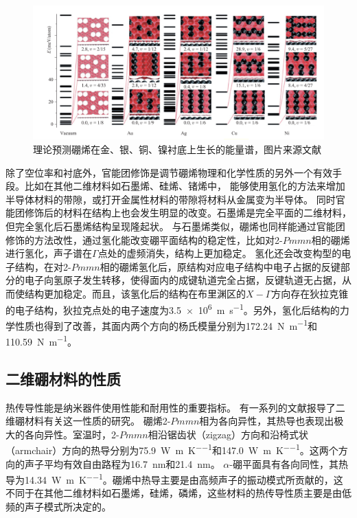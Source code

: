 \begin{figure}[bt]
  \includegraphics[width=1.0\textwidth]{figs/ch1_borophene_energy_spectra.png}
  \centering
  \caption{理论预测硼烯在金、银、铜、镍衬底上生长的能量谱，图片来源文献\cite{zhang2015two}}
  \label{fig:ch1_borophene_energy_spectra}
\end{figure}

除了空位率和衬底外，官能团修饰是调节硼烯物理和化学性质的另外一个有效手段。比如在其他二维材料如石墨烯、硅烯、锗烯中，
能够使用氢化的方法来增加半导体材料的带隙，或打开金属性材料的带隙将材料从金属变为半导体\cite{balog2010bandgap,bhattacharya2011strain,houssa2011electronic}。
同时官能团修饰后的材料在结构上也会发生明显的改变。石墨烯是完全平面的二维材料，但完全氢化后石墨烯结构呈现隆起状。
与石墨烯类似，硼烯也同样能通过官能团修饰的方法改性，通过氢化能改变硼平面结构的稳定性，比如对2-$Pmmn$相的硼烯进行氢化，声子谱在$\Gamma$点处的虚频消失，结构上更加稳定\cite{xu2016hydrogenated,wang2016high}。
氢化还会改变构型的电子结构\cite{xu2016hydrogenated}，在对2-$Pmmn$相的硼烯氢化后，原结构对应电子结构中电子占据的反键部分的电子向氢原子发生转移，使得面内的成键轨道完全占据，反键轨道无占据，从而使结构更加稳定。而且，该氢化后的结构在布里渊区的$X-\Gamma$方向存在狄拉克锥的电子结构，狄拉克点处的电子速度为\SI{3.5e6}{\metre\per\second}\cite{xu2016hydrogenated}。另外，氢化后结构的力学性质也得到了改善，其面内两个方向的杨氏模量分别为\SI{172.24}{\N\per\meter}和\SI{110.59}{\N\per\meter}\cite{wang2016high}。

\subsection{二维硼材料的性质}
热传导性能是纳米器件使用性能和耐用性的重要指标。
有一系列的文献\cite{li2018stretch, mortazavi2018borophene, zhou2017superior, liu2017anisotropic, sun2016first, mortazavi2017anomalous}报导了二维硼材料有关这一性质的研究。
硼烯2-$Pmmn$相为各向异性，其热导也表现出极大的各向异性。室温时，2-$Pmmn$相沿锯齿状（zigzag）方向和沿椅式状（armchair）方向的热导分别为\SI{75.9}{\W\per\meter\per\kelvin}和\SI{147.0}{\W\per\meter\per\kelvin}。这两个方向的声子平均有效自由路程为\SI{16.7}{\nm}和\SI{21.4}{\nm}。
$\alpha$-硼平面具有各向同性，其热导为\SI{14.34}{\W\per\meter\per\kelvin}。硼烯中热导主要是由高频声子的振动模式所贡献的，这不同于在其他二维材料如石墨烯，硅烯，磷烯，这些材料的热传导性质主要是由低频的声子模式所决定的\cite{gu2015first,qin2015anisotropic}。

